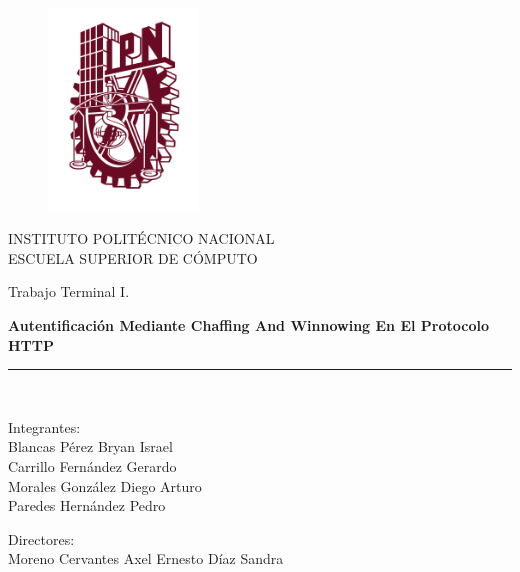 \documentclass[12pt, a4paper, titlepage]{report}
\begin{document}
	
	\begin{titlepage}
		
		\vspace*{-1.5in}
		\begin{figure}[htb]
			\begin{center}
				\includegraphics[width=4cm]{./imagenes/logoipn.png}
			\end{center}
		\end{figure}
		
		\begin{center}
		INSTITUTO POLITÉCNICO NACIONAL\\
		\vspace*{0.2in}
		ESCUELA SUPERIOR DE CÓMPUTO\\
		\vspace*{0.6in}
		\begin{large}
			Trabajo Terminal I.\\
		\end{large}
		\vspace*{0.2in}
		\begin{Large}
			\textbf{Autentificación Mediante Chaffing And Winnowing En El Protocolo HTTP} \\
		\end{Large}
		\vspace*{0.3in}
		\rule{80mm}{0.1mm}\\
		\vspace*{0.1in}
		\begin{large}
			\begin{center}
				Integrantes:\\
				Blancas Pérez Bryan Israel\\
				Carrillo Fernández Gerardo\\
				Morales González Diego Arturo\\
				Paredes Hernández Pedro\\
			\end{center}
		\end{large}
		\begin{large}
			Directores:\\
			Moreno Cervantes Axel Ernesto
			Díaz Sandra\\
		\end{large}
		\end{center}

	\end{titlepage}
	
\end{document}
